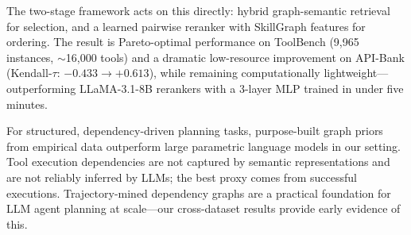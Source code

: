 \documentclass[lettersize,journal]{IEEEtran}
\begin{document}
The two-stage framework acts on this directly: hybrid graph-semantic retrieval for selection, and a learned pairwise reranker with SkillGraph features for ordering.
The result is Pareto-optimal performance on ToolBench (9,965 instances, $\sim$16,000 tools) and a dramatic low-resource improvement on API-Bank (Kendall-$\tau$: $-0.433 \to +0.613$), while remaining computationally lightweight---outperforming LLaMA-3.1-8B rerankers with a 3-layer MLP trained in under five minutes.

For structured, dependency-driven planning tasks, purpose-built graph priors from empirical data outperform large parametric language models in our setting.
Tool execution dependencies are not captured by semantic representations and are not reliably inferred by LLMs; the best proxy comes from successful executions.
Trajectory-mined dependency graphs are a practical foundation for LLM agent planning at scale---our cross-dataset results provide early evidence of this.



\end{document}
